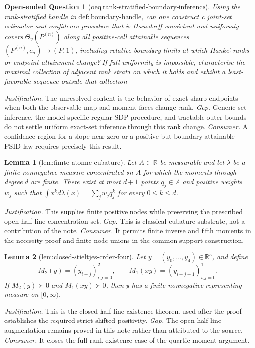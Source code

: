 \documentclass{article}
\newtheorem{lemma}{Lemma}
\newtheorem{openendedquestion}{Open-ended Question}
\begin{document}
\begin{openendedquestion}[oeq:rank-stratified-boundary-inference]\label{oeq:rank-stratified-boundary-inference}
Using the rank-stratified handle in \(\mathrm{def{:}boundary\text{-}handle}\), can one construct a joint-set estimator and confidence procedure that is Hausdorff consistent and uniformly covers \(\Theta_v(P^{(n)})\) along all positive-cell attainable sequences \((P^{(n)},c_n)\to(P,1)\), including relative-boundary limits at which Hankel ranks or endpoint attainment change? If full uniformity is impossible, characterize the maximal collection of adjacent rank strata on which it holds and exhibit a least-favorable sequence outside that collection.
\end{openendedquestion}
\par\smallskip\noindent \textit{Justification.} The unresolved content is the behavior of exact sharp endpoints when both the observable map and moment faces change rank. \textit{Gap.} Generic set inference, the model-specific regular SDP procedure, and tractable outer bounds do not settle uniform exact-set inference through this rank change. \textit{Consumer.} A confidence region for a slope near zero or a positive but boundary-attainable PSID law requires precisely this result.

\begin{lemma}[lem:finite-atomic-cubature]\label{lem:finite-atomic-cubature}
Let \(A\subset\mathbb R\) be measurable and let \(\lambda\) be a finite
nonnegative measure concentrated on \(A\) for which the moments through degree
\(d\) are finite.  There exist at most \(d+1\) points \(q_j\in A\) and
positive weights \(w_j\) such that
\(\int x^k d\lambda(x)=\sum_jw_jq_j^k\) for every \(0\le k\le d\).
\end{lemma}
\par\smallskip\noindent \textit{Justification.} This supplies finite positive nodes while preserving the prescribed open-half-line concentration set. \textit{Gap.} This is classical cubature substrate, not a contribution of the note. \textit{Consumer.} It permits finite inverse and fifth moments in the necessity proof and finite node unions in the common-support construction.

\begin{lemma}[lem:closed-stieltjes-order-four]\label{lem:closed-stieltjes-order-four}
Let \(y=(y_0,\ldots,y_4)\in\mathbb R^5\), and define
\[
 M_2(y)=(y_{i+j})_{i,j=0}^2,
 \qquad M_1(xy)=(y_{i+j+1})_{i,j=0}^1.
\]
If \(M_2(y)\succ0\) and \(M_1(xy)\succ0\), then \(y\) has a finite
nonnegative representing measure on \([0,\infty)\).
\end{lemma}
\par\smallskip\noindent \textit{Justification.} This is the closed-half-line existence theorem used after the proof establishes the required strict shifted positivity. \textit{Gap.} The open-half-line augmentation remains proved in this note rather than attributed to the source. \textit{Consumer.} It closes the full-rank existence case of the quartic moment argument.
\end{document}
